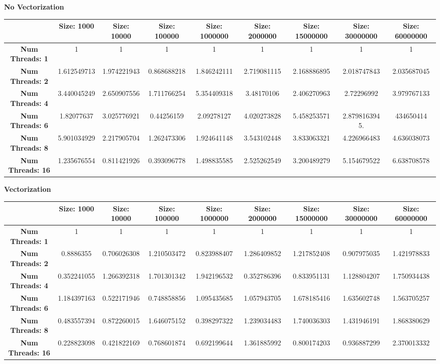 \documentclass[onecolumn,draftclsnofoot, 10pt, compsoc]{IEEEtran}
\begin{document}
	\begin{center}
		\textbf{No Vectorization}
	\end{center}
	{ \tabcolsep=1.5pt\relax \begin{tabular}{|c|c|c|c|c|c|c|c|c|}  \hline
		& \textbf{Size: 1000}	& \textbf{Size: 10000}	&  \textbf{Size: 100000} &	\textbf{Size: 1000000}	& \textbf{Size: 2000000}	& \textbf{Size: 15000000}	& \textbf{Size: 30000000} & \textbf{Size: 60000000}
		\\ \hline
		\textbf{Num Threads: 1}	&	1	&	1	&	1	&	1	&	1	&	1	&	1	&	1
		\\ \hline
		\textbf{Num Threads: 2}	&	1.612549713	&	1.974221943	&	0.868688218	&	1.846242111	&	2.719081115	&	2.168886895	&	2.018747843	&	2.035687045
		\\ \hline
		\textbf{Num Threads: 4}	&	3.440045249	&	2.650907556	&	1.711766254	&	5.354409318	&	3.48170106	&	2.406270963	&	2.72296992	&	3.979767133
		\\ \hline
		\textbf{Num Threads: 6}	&	1.82077637	&	3.025776921	&	0.44256159	&	2.09278127	&	4.020273828	&	5.458253571	&	2.879816394	5.&	434650414
		\\ \hline
		\textbf{Num Threads: 8}	&	5.901034929	&	2.217905704	&	1.262473306	&	1.924641148	&	3.543102448	&	3.833063321&		4.226966483	&	4.636038073
		\\ \hline
		\textbf{Num Threads: 16}	&	1.235676554	&	0.811421926	&	0.393096778	&	1.498835585	&	2.525262549&		3.200489279	&	5.154679522	&	6.638708578
		\\ \hline
\end{tabular}}
	\begin{center}
		\textbf{Vectorization}
	\end{center}
	{ \tabcolsep=1.5pt\relax\begin{tabular}{|c|c|c|c|c|c|c|c|c|}  \hline
			& \textbf{Size: 1000}	& \textbf{Size: 10000}	&  \textbf{Size: 100000} &	\textbf{Size: 1000000}	& \textbf{Size: 2000000}	& \textbf{Size: 15000000}	& \textbf{Size: 30000000} & \textbf{Size: 60000000}	\\ \hline
				\textbf{Num Threads: 1}	& 1	& 1	& 1	& 1	& 1	& 1	& 1	& 1
	\\ \hline
				\textbf{Num Threads: 2}	& 0.8886355	& 0.706026308	& 1.210503472	& 0.823988407	& 1.286409852	& 1.217852408	& 0.907975035	& 1.421978833
	\\ \hline
				\textbf{Num Threads: 4}	& 0.352241055	& 1.266392318	& 1.701301342	& 1.942196532	& 0.352786396	& 0.833951131	& 1.128804207	& 1.750934438
	\\ \hline
				\textbf{Num Threads: 6}	& 1.184397163	& 0.522171946	& 0.748858856	& 1.095435685	& 1.057943705	& 1.678185416	& 1.635602748	& 1.563705257
	\\ \hline
				\textbf{Num Threads: 8}	& 0.483557394	& 0.872260015	& 1.646075152	& 0.398297322	& 1.239034483	& 1.740036303	& 1.431946191	& 1.868380629
	\\ \hline
				\textbf{Num Threads: 16}	& 0.228823098	& 0.421822169	& 0.768601874	& 0.692199644	& 1.361885992	& 0.800174203	& 0.936887299	& 2.370013332	\\ \hline
	\end{tabular}}
\end{document}
